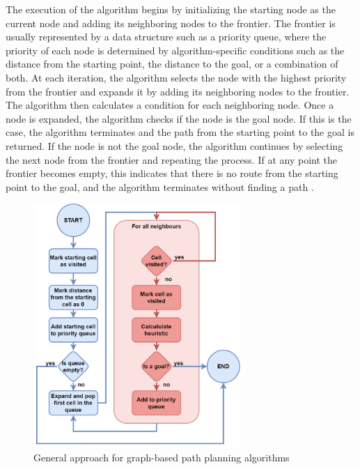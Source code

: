 The execution of the algorithm begins by initializing the starting node as the current node and adding its neighboring nodes to the frontier. The frontier is usually represented by a data structure such as a priority queue, where the priority of each node is determined by algorithm-specific conditions such as the distance from the starting point, the distance to the goal, or a combination of both. At each iteration, the algorithm selects the node with the highest priority from the frontier and expands it by adding its neighboring nodes to the frontier. The algorithm then calculates a condition for each neighboring node. Once a node is expanded, the algorithm checks if the node is the goal node. If this is the case, the algorithm terminates and the path from the starting point to the goal is returned. If the node is not the goal node, the algorithm continues by selecting the next node from the frontier and repeating the process. If at any point the frontier becomes empty, this indicates that there is no route from the starting point to the goal, and the algorithm terminates without finding a path \cite{multiple_path_planning_algos}.
\begin{figure}[H]
    \centering
    \includegraphics[width=0.7\textwidth]{pictures/simple_algos.png}
    \caption{General approach for graph-based path planning algorithms}
    \label{fig:simple_path_planning}
\end{figure}
